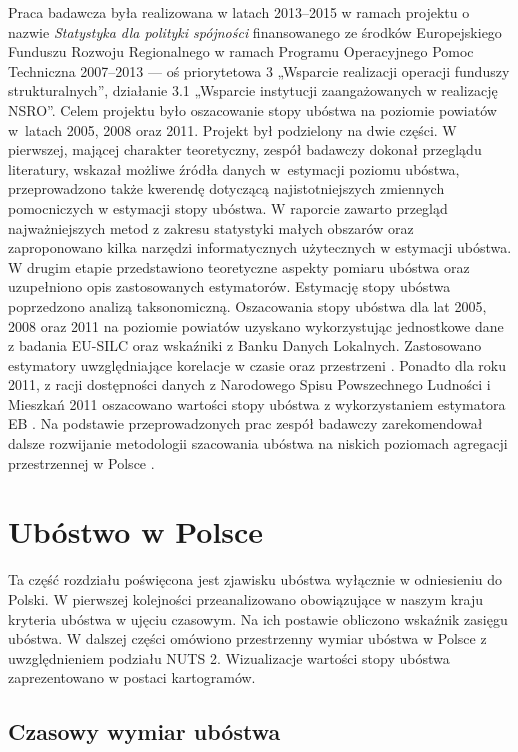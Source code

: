 Praca badawcza była realizowana w latach 2013--2015 w ramach projektu o nazwie \textit{Statystyka dla polityki spójności} finansowanego ze środków Europejskiego Funduszu Rozwoju Regionalnego w ramach Programu Operacyjnego Pomoc Techniczna 2007--2013  --- oś priorytetowa 3  „Wsparcie realizacji operacji funduszy strukturalnych”, działanie 3.1 „Wsparcie instytucji zaangażowanych w realizację NSRO”. Celem projektu było oszacowanie stopy ubóstwa na poziomie powiatów w~latach 2005, 2008 oraz 2011. Projekt był podzielony na dwie części. W pierwszej, mającej charakter teoretyczny, zespół badawczy dokonał przeglądu literatury, wskazał możliwe źródła danych w~estymacji poziomu ubóstwa, przeprowadzono także kwerendę dotyczącą najistotniejszych zmiennych pomocniczych w estymacji stopy ubóstwa. W raporcie zawarto przegląd najważniejszych metod z zakresu statystyki małych obszarów oraz zaproponowano kilka narzędzi informatycznych użytecznych w estymacji ubóstwa. W drugim etapie przedstawiono teoretyczne aspekty pomiaru ubóstwa oraz uzupełniono opis zastosowanych estymatorów. Estymację stopy ubóstwa poprzedzono analizą taksonomiczną. Oszacowania stopy ubóstwa dla lat 2005, 2008 oraz 2011 na poziomie powiatów uzyskano wykorzystując jednostkowe dane z badania EU-SILC oraz wskaźniki z Banku Danych Lokalnych. Zastosowano estymatory uwzględniające korelacje w czasie oraz przestrzeni \citep{raoyu1994,faydiallo2012}. Ponadto dla roku 2011, z racji dostępności danych z Narodowego Spisu Powszechnego Ludności i Mieszkań 2011 oszacowano wartości stopy ubóstwa z wykorzystaniem estymatora EB \citep{ebp2010}. Na podstawie przeprowadzonych prac zespół badawczy zarekomendował dalsze rozwijanie metodologii szacowania ubóstwa na niskich poziomach agregacji przestrzennej w Polsce \citep{pomiar2015}.

\section{Ubóstwo w Polsce}

Ta część rozdziału poświęcona jest zjawisku ubóstwa wyłącznie w odniesieniu do Polski. W pierwszej kolejności przeanalizowano obowiązujące w naszym kraju kryteria ubóstwa w ujęciu czasowym. Na ich postawie obliczono wskaźnik zasięgu ubóstwa. W dalszej części omówiono przestrzenny wymiar ubóstwa w Polsce z uwzględnieniem podziału NUTS 2. Wizualizacje wartości stopy ubóstwa zaprezentowano w postaci kartogramów.

\subsection{Czasowy wymiar ubóstwa}\label{pr:czasowy-wymiar-ubostwa}

